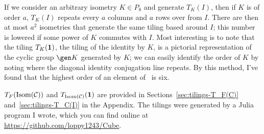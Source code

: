 If we consider an arbitrary isometry $K \in P_8$ and generate $T_K(I)$, then if $K$ is of
order $a$, $T_K(I)$ repeats every $a$ columns and $a$ rows over from $I$. There are then at
most $a^2$ isometries that generate the same tiling based around $I$; this number is lowered
if some power of $K$ commutes with $I$. Most interesting is to note that the tiling
$T_K(\mathbf{1})$, the tiling of the identity by $K$, is a pictorial representation of the cyclic
group $\gen K$ generated by $K$; we can easily identify the order of $K$ by noting where the
diagonal identity conjugation line repeats. By this method, I've found that the highest order
of an element of \IsomC\ is six.

$T_F(\operatorname{Isom}(\mathcal C))$ and $T_{\operatorname{Isom}(\mathcal C)}(\mathbf{1})$ are provided in Sections~\ref{sec:tilings-T_F(C)}
and~\ref{sec:tilings-T_C(I)} in the Appendix. The tilings were generated by a Julia program I
wrote, which you can find online at \url{https://github.com/loppy1243/Cube}.
